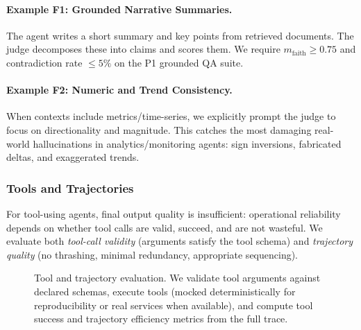 \paragraph{Example F1: Grounded Narrative Summaries.}
The agent writes a short summary and key points from retrieved documents.
The judge decomposes these into claims and scores them.
We require $m_{\text{faith}} \ge 0.75$ and contradiction rate $\le 5\%$ on the P1 grounded QA suite.

\paragraph{Example F2: Numeric and Trend Consistency.}
When contexts include metrics/time-series, we explicitly prompt the judge to focus on directionality and magnitude.
This catches the most damaging real-world hallucinations in analytics/monitoring agents: sign inversions, fabricated deltas, and exaggerated trends.

\subsubsection{Tools and Trajectories}

For tool-using agents, final output quality is insufficient: operational reliability depends on whether tool calls are valid, succeed, and are not wasteful.
We evaluate both \emph{tool-call validity} (arguments satisfy the tool schema) and \emph{trajectory quality} (no thrashing, minimal redundancy, appropriate sequencing).

\begin{figure}[t]
\centering
{}
\caption{Tool and trajectory evaluation.
We validate tool arguments against declared schemas, execute tools (mocked deterministically for reproducibility or real services when available), and compute tool success and trajectory efficiency metrics from the full trace.}
\label{fig:tools-traj}
\end{figure}


